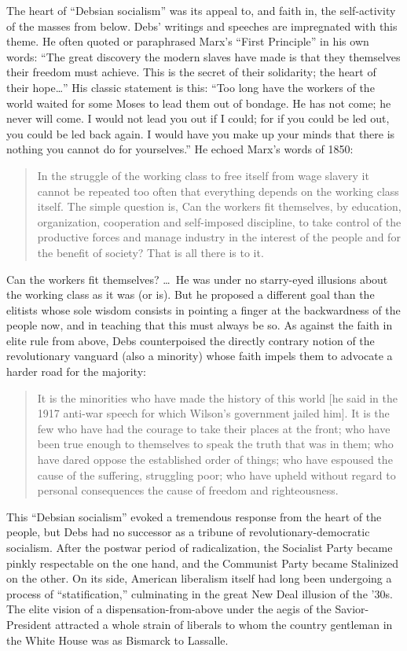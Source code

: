 The heart of ``Debsian socialism'' was its appeal to, and faith in, the self-activity of the masses from below. Debs' writings and speeches are impregnated with this theme. He often quoted or paraphrased Marx's ``First Principle'' in his own words: ``The great discovery the modern slaves have made is that they themselves their freedom must achieve. This is the secret of their solidarity; the heart of their hope\ldots'' His classic statement is this: ``Too long have the workers of the world waited for some Moses to lead them out of bondage. He has not come; he never will come. I would not lead you out if I could; for if you could be led out, you could be led back again. I would have you make up your minds that there is nothing you cannot do for yourselves.'' He echoed Marx's words of 1850:

\blockquote{In the struggle of the working class to free itself from wage slavery it cannot be repeated too often that everything depends on the working class itself. The simple question is, Can the workers fit themselves, by education, organization, cooperation and self-imposed discipline, to take control of the productive forces and manage industry in the interest of the people and for the benefit of society? That is all there is to it.}

Can the workers fit themselves? \ldots\ He was under no starry-eyed illusions about the working class as it was (or is). But he proposed a different goal than the elitists whose sole wisdom consists in pointing a finger at the backwardness of the people now, and in teaching that this must always be so. As against the faith in elite rule from above, Debs counterpoised the directly contrary notion of the revolutionary vanguard (also a minority) whose faith impels them to advocate a harder road for the majority:

\blockquote{It is the minorities who have made the history of this world [he said in the 1917 anti-war speech for which Wilson's government jailed him]. It is the few who have had the courage to take their places at the front; who have been true enough to themselves to speak the truth that was in them; who have dared oppose the established order of things; who have espoused the cause of the suffering, struggling poor; who have upheld without regard to personal consequences the cause of freedom and righteousness.}

This ``Debsian socialism'' evoked a tremendous response from the heart of the people, but Debs had no successor as a tribune of revolutionary-democratic socialism. After the postwar period of radicalization, the Socialist Party became pinkly respectable on the one hand, and the Communist Party became Stalinized on the other. On its side, American liberalism itself had long been undergoing a process of ``statification,'' culminating in the great New Deal illusion of the '30s. The elite vision of a dispensation-from-above under the aegis of the Savior-President attracted a whole strain of liberals to whom the country gentleman in the White House was as Bismarck to Lassalle.

